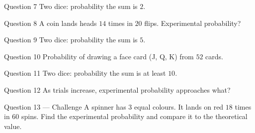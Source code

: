 \documentclass[11pt]{article}
\begin{document}
\begin{qbox}{Question 7}
Two dice: probability the sum is $2$.\workspace{2.4cm}
\end{qbox}

\begin{qbox}{Question 8}
A coin lands heads $14$ times in $20$ flips. Experimental probability?\workspace{2.4cm}
\end{qbox}

\begin{qbox}{Question 9}
Two dice: probability the sum is $5$.\workspace{2.4cm}
\end{qbox}

\begin{qbox}{Question 10}
Probability of drawing a face card (J, Q, K) from $52$ cards.\workspace{2.4cm}
\end{qbox}

\begin{qbox}{Question 11}
Two dice: probability the sum is at least $10$.\workspace{2.4cm}
\end{qbox}

\begin{qbox}{Question 12}
As trials increase, experimental probability approaches what?\workspace{2.4cm}
\end{qbox}

\begin{qbox}{Question 13 --- Challenge}
A spinner has $3$ equal colours. It lands on red $18$ times in $60$ spins. Find the experimental probability and compare it to the theoretical value.\workspace{3.2cm}
\end{qbox}

\clearpage
{}
\end{document}

